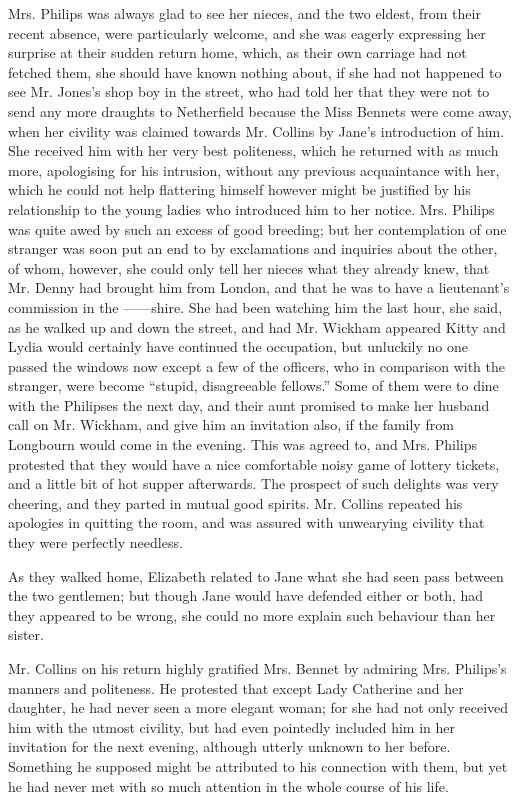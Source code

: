 Mrs. Philips was always glad to see her nieces, and the
two eldest, from their recent absence, were particularly
welcome, and she was eagerly expressing her surprise at
their sudden return home, which, as their own carriage
had not fetched them, she should have known nothing
about, if she had not happened to see Mr. Jones’s shop boy
in the street, who had told her that they were not to send
any more draughts to Netherfield because the Miss
Bennets were come away, when her civility was claimed
towards Mr. Collins by Jane’s introduction of him. She
received him with her very best politeness, which he
returned with as much more, apologising for his intrusion,
without any previous acquaintance with her, which he
could not help flattering himself however might be justified
by his relationship to the young ladies who introduced
him to her notice. Mrs. Philips was quite awed by such
an excess of good breeding; but her contemplation of
one stranger was soon put an end to by exclamations and
inquiries about the other, of whom, however, she could
only tell her nieces what they already knew, that Mr.
Denny had brought him from London, and that he was
to have a lieutenant’s commission in the ------shire. She
had been watching him the last hour, she said, as he walked
up and down the street, and had Mr. Wickham appeared
Kitty and Lydia would certainly have continued the
occupation, but unluckily no one passed the windows
now except a few of the officers, who in comparison with
the stranger, were become “stupid, disagreeable fellows.”
Some of them were to dine with the Philipses the next
day, and their aunt promised to make her husband call
on Mr. Wickham, and give him an invitation also, if the
family from Longbourn would come in the evening. This
was agreed to, and Mrs. Philips protested that they would
have a nice comfortable noisy game of lottery tickets, and
a little bit of hot supper afterwards. The prospect of
such delights was very cheering, and they parted in mutual
good spirits. Mr. Collins repeated his apologies in quitting
the room, and was assured with unwearying civility that
they were perfectly needless.

As they walked home, Elizabeth related to Jane what
she had seen pass between the two gentlemen; but though
Jane would have defended either or both, had they
appeared to be wrong, she could no more explain such
behaviour than her sister.

Mr. Collins on his return highly gratified Mrs. Bennet
by admiring Mrs. Philips’s manners and politeness. He
protested that except Lady Catherine and her daughter,
he had never seen a more elegant woman; for she had
not only received him with the utmost civility, but had
even pointedly included him in her invitation for the next
evening, although utterly unknown to her before. Something
he supposed might be attributed to his connection
with them, but yet he had never met with so much
attention in the whole course of his life.

